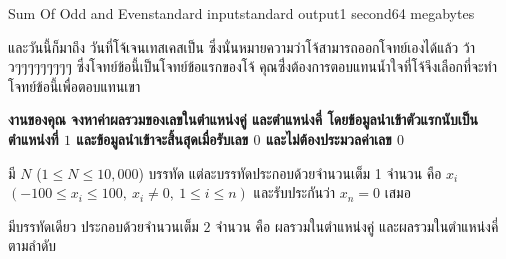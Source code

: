 \begin{problem}{Sum Of Odd and Even}{standard input}{standard output}{1 second}{64 megabytes}

\large{และวันนี้ก็มาถึง วันที่โจ้เจนเทสเคสเป็น ซึ่งนั่นหมายความว่าโจ้สามารถออกโจทย์เองได้แล้ว ว้าวๆๆๆๆๆๆๆๆๆ ซึ่งโจทย์ข้อนี้เป็นโจทย์ข้อแรกของโจ้ คุณซึ่่งต้องการตอบแทนน้ำใจที่โจ้จึงเลือกที่จะทำโจทย์ข้อนี้เพื่อตอบแทนเขา}

\large{\bf{งานของคุณ} จงหาค่าผลรวมของเลขในตำแหน่งคู่ และตำแหน่งคี่ \bf{โดยข้อมูลนำเข้าตัวแรกนับเป็นตำแหน่งที่ $1$} และข้อมูลนำเข้าจะสิ้นสุดเมื่อรับเลข $0$ และไม่ต้องประมวลค่าเลข $0$}

\InputFile
\large{มี $N$ ($1 \le N \le 10,000$) บรรทัด แต่ละบรรทัดประกอบด้วยจำนวนเต็ม 1 จำนวน คือ $x_i$ $(-100 \le x_i \le 100, \ x_i \neq 0,\ 1 \le i \le n)$ และรับประกันว่า $x_n = 0$ เสมอ}


\OutputFile
\large{มีบรรทัดเดียว ประกอบด้วยจำนวนเต็ม $2$ จำนวน คือ ผลรวมในตำแหน่งคู่ และผลรวมในตำแหน่งคี่ ตามลำดับ}

\Examples

\begin{example}
%
%
\end{example}

\end{problem}

